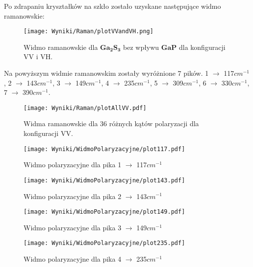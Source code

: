 Po zdrapaniu kryształków na szkło zostało uzyskane następujące widmo ramanowskie:

\begin{figure}[H]
	\begin{center}
		\texttt{[image: Wyniki/Raman/plotVVandVH.png]}
		\caption{Widmo ramanowskie dla $\mathbf{Ga_{2}S_{3}}$ bez wpływu $\mathbf{GaP}$ dla konfiguracji VV i VH.}
	\end{center}
\end{figure}

Na powyższym widmie ramanowskim zostały wyróżnione 7 pików. 1 $\rightarrow$ 117$cm^{-1}$, 2 $\rightarrow$ 143$cm^{-1}$, 3 $\rightarrow$ 149$cm^{-1}$, 4 $\rightarrow$ 235$cm^{-1}$, 5 $\rightarrow$ 309$cm^{-1}$, 6 $\rightarrow$ 330$cm^{-1}$, 7 $\rightarrow$ 390$cm^{-1}$. 

\begin{figure}[H]
	\begin{center}
		\texttt{[image: Wyniki/Raman/plotAllVV.pdf]}
		\caption{Widma ramanowskie dla 36 różnych kątów polaryzacji dla konfiguracji VV.}
	\end{center}
\end{figure}

\begin{figure}[H]
	\begin{center}
		\texttt{[image: Wyniki/WidmoPolaryzacyjne/plot117.pdf]}
		\caption{Widmo polaryzacyjne dla pika 1 $\rightarrow$ 117$cm^{-1}$ }
	\end{center}
\end{figure}

\begin{figure}[H]
	\begin{center}
		\texttt{[image: Wyniki/WidmoPolaryzacyjne/plot143.pdf]}
		\caption{Widmo polaryzacyjne dla pika 2 $\rightarrow$ 143$cm^{-1}$ }
	\end{center}
\end{figure}

\begin{figure}[H]
	\begin{center}
		\texttt{[image: Wyniki/WidmoPolaryzacyjne/plot149.pdf]}
		\caption{Widmo polaryzacyjne dla pika 3 $\rightarrow$ 149$cm^{-1}$ }
	\end{center}
\end{figure}

\begin{figure}[H]
	\begin{center}
		\texttt{[image: Wyniki/WidmoPolaryzacyjne/plot235.pdf]}
		\caption{Widmo polaryzacyjne dla pika 4 $\rightarrow$ 235$cm^{-1}$ }
	\end{center}
\end{figure}

